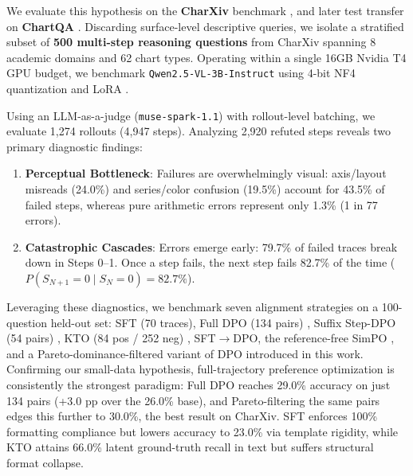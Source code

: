 \documentclass[11pt]{article}
\begin{document}
We evaluate this hypothesis on the \textbf{CharXiv} benchmark \citep{wang2024charxiv}, and later test transfer on \textbf{ChartQA} \citep{masry2022chartqa}. Discarding surface-level descriptive queries, we isolate a stratified subset of \textbf{500 multi-step reasoning questions} from CharXiv spanning 8 academic domains and 62 chart types. Operating within a single 16GB Nvidia T4 GPU budget, we benchmark \texttt{Qwen2.5-VL-3B-Instruct} \citep{bai2025qwen25vl} using 4-bit NF4 quantization \citep{dettmers2023qlora} and LoRA \citep{hu2021lora}.

Using an LLM-as-a-judge (\texttt{muse-spark-1.1}) \citep{meta2026musespark, zheng2023judging} with rollout-level batching, we evaluate 1,274 rollouts (4,947 steps). Analyzing 2,920 refuted steps reveals two primary diagnostic findings:
\begin{enumerate}[noitemsep,topsep=0pt]
    \item \textbf{Perceptual Bottleneck}: Failures are overwhelmingly visual: axis/layout misreads (24.0\%) and series/color confusion (19.5\%) account for 43.5\% of failed steps, whereas pure arithmetic errors represent only 1.3\% (1 in 77 errors).
    \item \textbf{Catastrophic Cascades}: Errors emerge early: 79.7\% of failed traces break down in Steps 0--1. Once a step fails, the next step fails 82.7\% of the time ($P(S_{N+1}=0 \mid S_N=0) = 82.7\%$).
\end{enumerate}

Leveraging these diagnostics, we benchmark seven alignment strategies on a 100-question held-out set: SFT (70 traces), Full DPO (134 pairs) \citep{rafailov2023dpo}, Suffix Step-DPO (54 pairs) \citep{lai2024stepdpo}, KTO (84 pos / 252 neg) \citep{ethayarajh2024kto}, SFT$\rightarrow$DPO, the reference-free SimPO \citep{meng2024simpo}, and a Pareto-dominance-filtered variant of DPO introduced in this work. Confirming our small-data hypothesis, full-trajectory preference optimization is consistently the strongest paradigm: Full DPO reaches 29.0\% accuracy on just 134 pairs (+3.0 pp over the 26.0\% base), and Pareto-filtering the same pairs edges this further to 30.0\%, the best result on CharXiv. SFT enforces 100\% formatting compliance but lowers accuracy to 23.0\% via template rigidity, while KTO attains 66.0\% latent ground-truth recall in text but suffers structural format collapse.
\end{document}
